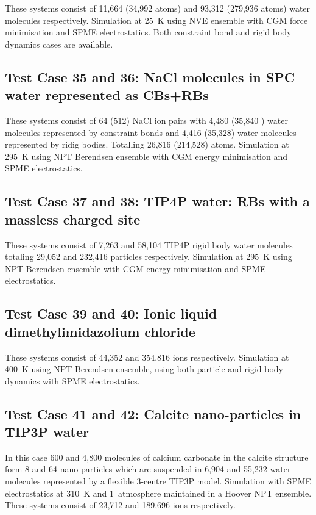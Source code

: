 These systems consist of 11,664 (34,992 atoms) and 93,312 (279,936
atoms) water molecules respectively.  Simulation at 25~K using NVE
ensemble with CGM force minimisation and SPME electrostatics.  Both
constraint bond and rigid body dynamics cases are available.

\subsection{Test Case 35 and 36: NaCl molecules in SPC water represented as CBs+RBs}

These systems consist of 64 (512) NaCl ion pairs with 4,480 (35,840
) water molecules represented by constraint bonds and 4,416 (35,328)
water molecules represented by ridig bodies.  Totalling 26,816 (214,528)
atoms.  Simulation at 295~K using NPT Berendsen ensemble with CGM energy
minimisation and SPME electrostatics.

\subsection{Test Case 37 and 38: TIP4P water: RBs with a massless charged site}

These systems consist of 7,263 and 58,104 TIP4P rigid body water molecules
totaling 29,052 and 232,416 particles respectively.  Simulation at 295~K
using NPT Berendsen ensemble with CGM energy minimisation and SPME electrostatics.

\subsection{Test Case 39 and 40: Ionic liquid dimethylimidazolium chloride}

These systems consist of 44,352 and 354,816 ions respectively.  Simulation
at 400~K using NPT Berendsen ensemble, using both particle and rigid body
dynamics with SPME electrostatics.

\subsection{Test Case 41 and 42: Calcite nano-particles in TIP3P water}

In this case 600 and 4,800 molecules of calcium carbonate in the calcite
structure form 8 and 64 nano-particles which are suspended in 6,904 and
55,232 water molecules represented by a flexible 3-centre TIP3P model.
Simulation with SPME electrostatics at 310~K and 1~atmosphere maintained
in a Hoover NPT ensemble.  These systems consist of 23,712 and 189,696
ions respectively.


